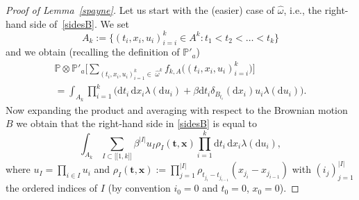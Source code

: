 \documentclass[11pt]{article}
\newcommand{\ie}{i.e.,\xspace}
\numberwithin{equation}{section}
\let\sep:
\newcommand{\lint}{\mathopen{[\![}}
\newcommand{\rint}{\mathclose{]\!]}}
\theoremstyle{definition}
\newcommand{\bt}{\boldsymbol{t}}
\newcommand{\bx}{\boldsymbol{x}}
\newcommand{\dd}{\mathrm{d}}
\newcommand{\bbP}{{\ensuremath{\mathbb P}} }
\let\go\omega
\begin{document}
\begin{proof}[Proof of Lemma~\ref{spayne}]
Let us start with the (easier) case of $\hat \go$, \ie the right-hand side of~\eqref{sidesB}.
We set
\[
A_k:= \bigl\{ (t_i,x_i,u_i)_{i=i}^k\in A^k \sep t_1<t_2<\dots<t_k \bigr\}
\]
and we obtain (recalling the definition of $\bbP'_a$)\vspace*{-5pt}
\begin{multline*}
\bbP\otimes \bbP'_a \bigg[ \sum_{(t_i,x_i,u_i)_{i=1}^k\in \; \hat \go^k} f_{k,A} \bigl((t_i,x_i,u_i)_{i=i}^k \bigr) \bigg]\\[-8pt]
= \int_{A_k} \prod_{i=1}^k\bigl(\dd t_i\,\dd x_i \lambda (\dd u_i) + \beta \dd t_i \delta_{B_{t_i}}(\dd x_i) u_i \lambda (\dd u_i) \bigr).
\end{multline*}
Now expanding the product and averaging with respect to the Brownian motion~$B$ we obtain that the
right-hand side in \eqref{sidesB} is equal to
\begin{equation}
\label{rhsofsides}
\int_{A_k} \sum_{I\subset\lint 1,k\rint}\beta^{|I|} u_I \rho_I(\bt,\bx) \prod_{i=1}^k \dd t_i\,\dd x_i \lambda (\dd u_i),
\end{equation}
where $u_I=\prod_{i\in I} u_i$ and $\rho_I(\bt, \bx):= \prod_{j=1}^{|I|} \rho_{t_{j_{i}}- t_{j_{i-1}}}(x_{j_{i}}-x_{j_{i-1}})$ with
$(i_j)_{j=1}^{|I|}$ the ordered indices of $I$ (by convention $i_0=0$ and $t_0=0$, $x_0=0$).


\end{proof}
\end{document}
